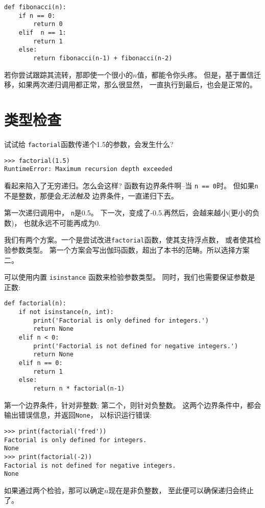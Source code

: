 \documentclass[10pt]{book}
\begin{document}
\begin{verbatim}
def fibonacci(n):
    if n == 0:
        return 0
    elif  n == 1:
        return 1
    else:
        return fibonacci(n-1) + fibonacci(n-2)
\end{verbatim}
%
若你尝试跟踪其流转，那即使一个很小的$n$值，都能令你头疼。
但是，基于置信迁移，如果两次递归调用都正常，那么很显然，
一直执行到最后，也会是正常的。


\section{类型检查}
\label{guardian}

试试给 {\tt factorial}函数传递个1.5的参数，会发生什么?

\begin{verbatim}
>>> factorial(1.5)
RuntimeError: Maximum recursion depth exceeded
\end{verbatim}
%
看起来陷入了无穷递归。怎么会这样? 函数有边界条件啊--当 {\tt n == 0}时。
但如果{\tt n}不是整数，那便会{\em 无法触及} 边界条件，一直递归下去。

第一次递归调用中，{ \tt n}是0.5。
下一次，变成了-0.5.再然后，会越来越小(更小的负数)，
也就永远不可能再成为0.

我们有两个方案。一个是尝试改进{\tt factorial}函数，使其支持浮点数，
或者使其检验参数类型。
第一个方案会写出伽玛函数，超出了本书的范畴。所以选择方案二。

可以使用内置 {\tt isinstance} 函数来检验参数类型。
同时，我们也需要保证参数是正数:

\begin{verbatim}
def factorial(n):
    if not isinstance(n, int):
        print('Factorial is only defined for integers.')
        return None
    elif n < 0:
        print('Factorial is not defined for negative integers.')
        return None
    elif n == 0:
        return 1
    else:
        return n * factorial(n-1)
\end{verbatim}
%
第一个边界条件，针对非整数;
第二个，则针对负整数。
这两个边界条件中，都会输出错误信息，并返回{\tt None}，
以标识运行错误:

\begin{verbatim}
>>> print(factorial('fred'))
Factorial is only defined for integers.
None
>>> print(factorial(-2))
Factorial is not defined for negative integers.
None
\end{verbatim}
% 
如果通过两个检验，那可以确定$n$现在是非负整数，
至此便可以确保递归会终止了。
\end{document}
